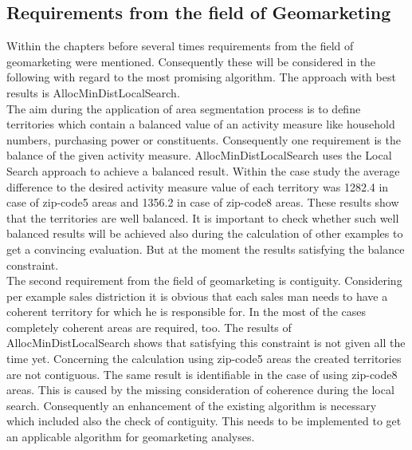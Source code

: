 \subsection{Requirements from the field of Geomarketing}
Within the chapters before several times requirements from the field of geomarketing were mentioned. Consequently these will be considered in the following with regard to the most promising algorithm. The approach with best results is AllocMinDistLocalSearch. \\
The aim during the application of area segmentation process is to define territories which contain a balanced value of an activity measure like household numbers, purchasing power or constituents. Consequently one requirement is the balance of the given activity measure. AllocMinDistLocalSearch uses the Local Search approach to achieve a balanced result. Within the case study the average difference to the desired activity measure value of each territory was 1282.4 in case of zip-code5 areas and 1356.2 in case of zip-code8 areas. These results show that the territories are well balanced. It is important to check whether such well balanced results will be achieved also during the calculation of other examples to get a convincing evaluation. But at the moment the results satisfying the balance constraint.\\
The second requirement from the field of geomarketing is contiguity. Considering per example sales distriction it is obvious that each sales man needs to have a coherent territory for which he is responsible for. In the most of the cases completely coherent areas are required, too. The results of AllocMinDistLocalSearch shows that satisfying this constraint is not given all the time yet. Concerning the calculation using zip-code5 areas the created territories are not contiguous. The same result is identifiable in the case of using zip-code8 areas. This is caused by the missing consideration of coherence during the local search. Consequently an enhancement of the existing algorithm is necessary which included also the check of contiguity. This needs to be implemented to get an applicable algorithm for geomarketing analyses. \\
